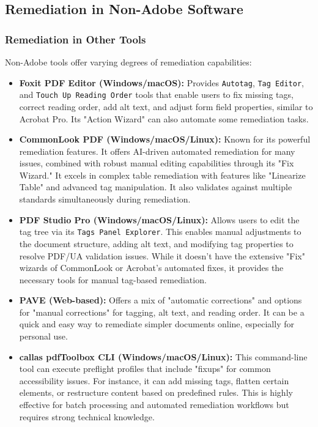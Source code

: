 \subsection{Remediation in Non-Adobe Software}
\label{subsec:remediation-non-adobe}

\subsubsection{Remediation in Other Tools}

Non-Adobe tools offer varying degrees of remediation capabilities:
\begin{itemize}
\item \textbf{Foxit PDF Editor (Windows/macOS):} Provides \texttt{Autotag}, \texttt{Tag Editor}, and \texttt{Touch Up Reading Order} tools that enable users to fix missing tags, correct reading order, add alt text, and adjust form field properties, similar to Acrobat Pro. Its "Action Wizard" can also automate some remediation tasks.
\item \textbf{CommonLook PDF (Windows/macOS/Linux):} Known for its powerful remediation features. It offers AI-driven automated remediation for many issues, combined with robust manual editing capabilities through its "Fix Wizard." It excels in complex table remediation with features like "Linearize Table" and advanced tag manipulation. It also validates against multiple standards simultaneously during remediation.
\item \textbf{PDF Studio Pro (Windows/macOS/Linux):} Allows users to edit the tag tree via its \texttt{Tags Panel Explorer}. This enables manual adjustments to the document structure, adding alt text, and modifying tag properties to resolve PDF/UA validation issues. While it doesn't have the extensive "Fix" wizards of CommonLook or Acrobat's automated fixes, it provides the necessary tools for manual tag-based remediation.
\item \textbf{PAVE (Web-based):} Offers a mix of "automatic corrections" and options for "manual corrections" for tagging, alt text, and reading order. It can be a quick and easy way to remediate simpler documents online, especially for personal use.
\item \textbf{callas pdfToolbox CLI (Windows/macOS/Linux):} This command-line tool can execute preflight profiles that include "fixups" for common accessibility issues. For instance, it can add missing tags, flatten certain elements, or restructure content based on predefined rules. This is highly effective for batch processing and automated remediation workflows but requires strong technical knowledge.
\end{itemize}


